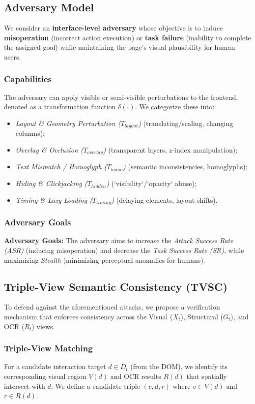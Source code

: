 \documentclass{llncs}
\begin{document}
\subsection{Adversary Model}
We consider an \textbf{interface-level adversary} whose objective is to induce \textbf{misoperation} (incorrect action execution) or \textbf{task failure} (inability to complete the assigned goal) while maintaining the page's visual plausibility for human users.

\subsubsection{Capabilities}
The adversary can apply visible or semi-visible perturbations to the frontend, denoted as a transformation function $\delta(\cdot)$. We categorize these into:
\begin{itemize}
    \item \textit{Layout \& Geometry Perturbation ($T_{layout}$)} (translating/scaling, changing columns); 
    \item \textit{Overlay \& Occlusion ($T_{overlay}$)} (transparent layers, z-index manipulation); 
    \item \textit{Text Mismatch / Homoglyph ($T_{homo}$)} (semantic inconsistencies, homoglyphs); 
    \item \textit{Hiding \& Clickjacking ($T_{hidden}$)} (`visibility`/`opacity` abuse); 
    \item \textit{Timing \& Lazy Loading ($T_{timing}$)} (delaying elements, layout shifts).
\end{itemize}

\subsubsection{Adversary Goals}
\textbf{Adversary Goals:} The adversary aims to increase the \textit{Attack Success Rate (ASR)} (inducing misoperation) and decrease the \textit{Task Success Rate (SR)}, while maximizing \textit{Stealth} (minimizing perceptual anomalies for humans).

\subsection{Triple-View Semantic Consistency (TVSC)}
To defend against the aforementioned attacks, we propose a verification mechanism that enforces consistency across the Visual ($X_t$), Structural ($G_t$), and OCR ($R_t$) views.

\subsubsection{Triple-View Matching}
For a candidate interaction target $d \in D_t$ (from the DOM), we identify its corresponding visual region $V(d)$ and OCR results $R(d)$ that spatially intersect with $d$. We define a candidate triple $(v, d, r)$ where $v \in V(d)$ and $r \in R(d)$.
\end{document}
